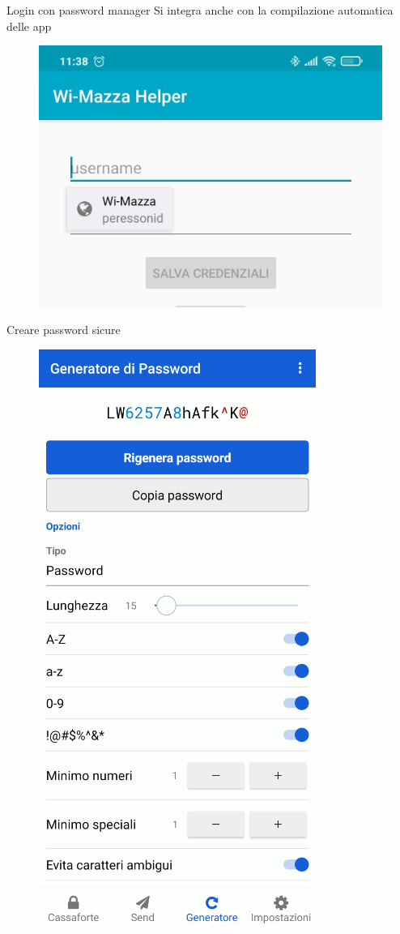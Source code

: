 \begin{myframe}{Login con password manager}
  Si integra anche con la compilazione automatica delle app
  \begin{figure}
    \includegraphics[width=.5\textwidth]{img/loginapp}
  \end{figure}
\end{myframe}

\begin{myframe}{Creare password sicure}
  \begin{figure}
    \includegraphics[height=.8\paperheight]{img/generatepass}
  \end{figure}
\end{myframe}


